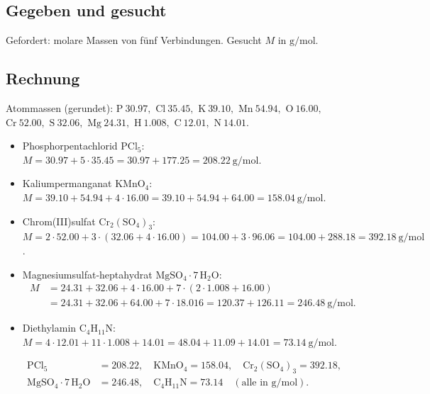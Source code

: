 
\subsection*{Gegeben und gesucht}
Gefordert: molare Massen von fünf Verbindungen. Gesucht $M$ in $\mathrm{g/mol}$.

\subsection*{Rechnung}
Atommassen (gerundet): $\mathrm{P}\ 30.97,$ $\mathrm{Cl}\ 35.45,$
$\mathrm{K}\ 39.10,$ $\mathrm{Mn}\ 54.94,$ $\mathrm{O}\ 16.00,$
$\mathrm{Cr}\ 52.00,$ $\mathrm{S}\ 32.06,$ $\mathrm{Mg}\ 24.31,$
$\mathrm{H}\ 1.008,$ $\mathrm{C}\ 12.01,$ $\mathrm{N}\ 14.01$.

\begin{itemize}
  \item[a)] Phosphorpentachlorid $\mathrm{PCl_5}$:
        $M = 30.97 + 5\cdot 35.45 = 30.97 + 177.25 = 208.22\ \mathrm{g/mol}$.
  \item[b)] Kaliumpermanganat $\mathrm{KMnO_4}$:
        $M = 39.10 + 54.94 + 4\cdot 16.00 = 39.10+54.94+64.00 = 158.04\ \mathrm{g/mol}$.
  \item[c)] Chrom(III)sulfat $\mathrm{Cr_2(SO_4)_3}$:
        $M = 2\cdot 52.00 + 3\cdot(32.06+4\cdot 16.00)
        = 104.00 + 3\cdot 96.06 = 104.00 + 288.18 = 392.18\ \mathrm{g/mol}$.
  \item[d)] Magnesiumsulfat-heptahydrat $\mathrm{MgSO_4 \cdot 7\,H_2O}$:
        \begin{align*}
          M &= 24.31 + 32.06 + 4\cdot 16.00
              + 7\cdot(2\cdot 1.008 + 16.00) \\
            &= 24.31 + 32.06 + 64.00 + 7\cdot 18.016
            = 120.37 + 126.11 = 246.48\ \mathrm{g/mol}.
        \end{align*}
  \item[e)] Diethylamin $\mathrm{C_4H_{11}N}$:
        $M = 4\cdot 12.01 + 11\cdot 1.008 + 14.01
        = 48.04 + 11.09 + 14.01 = 73.14\ \mathrm{g/mol}$.
\end{itemize}

\begin{ergebnis}
\begin{align*}
  \mathrm{PCl_5} &= 208.22,\quad
  \mathrm{KMnO_4} = 158.04,\quad
  \mathrm{Cr_2(SO_4)_3} = 392.18, \\
  \mathrm{MgSO_4 \cdot 7\,H_2O} &= 246.48,\quad
  \mathrm{C_4H_{11}N} = 73.14
  \quad(\text{alle in }\mathrm{g/mol}).
\end{align*}
\end{ergebnis}

